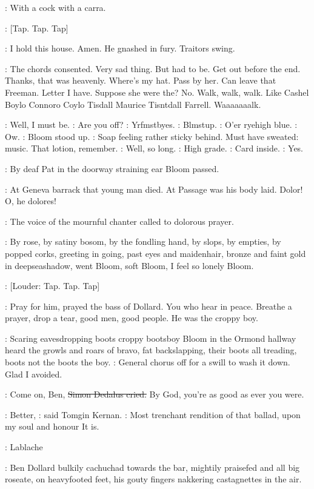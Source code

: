 \BloomInt:
With a cock with a carra.

\stripling:
[Tap.
Tap.
Tap]

\BloomInt:
I hold this house.
Amen.
He gnashed in fury.
Traitors swing.

\BloomInt:
The chords consented.
Very sad thing.
But had to be.
Get out before
the end.
Thanks,
that was heavenly.
Where's my hat.
Pass by her.
Can
leave that Freeman.
Letter I have.
Suppose she were the?
No.
Walk,
walk,
walk.
Like Cashel Boylo Connoro Coylo Tisdall Maurice Tisntdall
Farrell.
Waaaaaaalk.

\BloomInt:
Well,
I must be.
\goulding:
Are you off?
\BloomInt:
Yrfmstbyes.
\BloomInt:
Blmstup.
\goulding:
O'er ryehigh blue.
\BloomInt:
Ow.
:
Bloom stood up.
\BloomInt:
Soap feeling rather sticky behind.
Must have
sweated:
music.
That lotion,
remember.
\BloomInt:
Well,
so long.
\goulding:
High grade.
\BloomInt:
Card inside.
\goulding:
Yes.

:
By deaf Pat in the doorway
straining ear Bloom passed.

\BloomInt:
At Geneva barrack that young man died.
At Passage was his body
laid.
Dolor!
O,
he dolores!

:
The voice of the mournful chanter called to
dolorous prayer.

:
By rose,
by satiny bosom,
by the fondling hand,
by slops,
by empties,
by popped corks,
greeting in going,
past eyes and maidenhair,
bronze and
faint gold in deepseashadow,
went Bloom,
soft Bloom,
I feel so lonely
Bloom.

\stripling:
[Louder:
Tap.
Tap.
Tap]

:
Pray for him,
prayed the bass of Dollard.
You who hear in peace.
Breathe
a prayer,
drop a tear,
good men,
good people.
He was the croppy boy.

:
Scaring eavesdropping boots croppy bootsboy Bloom in the Ormond
hallway heard the growls and roars of bravo,
fat backslapping,
their boots
all treading,
boots not the boots the boy.
\BloomInt:
General chorus off for a swill
to wash it down.
Glad I avoided.

\simon:
Come on,
Ben,
\sout{Simon Dedalus cried.}
By God,
you're as good as ever you were.

:
Better,
:
said Tomgin Kernan.
:
Most trenchant rendition of that ballad,
upon my soul and honour It is.

\cowley:
Lablache

:
Ben Dollard bulkily cachuchad towards the bar,
mightily praisefed and all
big roseate,
on heavyfooted feet,
his gouty fingers nakkering castagnettes
in the air.

